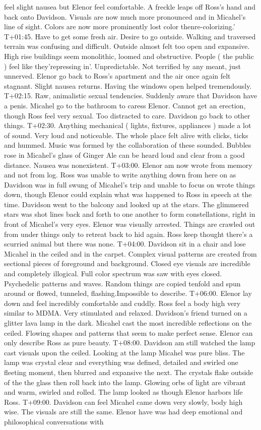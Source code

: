 \documentclass[12pt]{book}
\begin{document}
feel slight nausea but Elenor feel comfortable. A freckle leaps off Ross's hand and back onto Davidson. Visuals are now much more pronounced and in Micahel's line of sight. Colors are now more prominently lost color thenre-colorizing.' T+01:45. Have to get some fresh air. Desire to go outside. Walking and traversed terrain was confusing and difficult. Outside almost felt too open and expansive. High rise buildings seem monolithic, loomed and obstructive. People ( the public ) feel like they'repressing in'. Unpredictable. Not terrified by any meant, just unnerved. Elenor go back to Ross's apartment and the air once again felt stagnant. Slight nausea returns. Having the windows open helped tremendously. T+02:15. Raw, animalistic sexual tendencies. Suddenly aware that Davidson have a penis. Micahel go to the bathroom to caress Elenor. Cannot get an erection, though Ross feel very sexual. Too distracted to care. Davidson go back to other things. T+02:30. Anything mechanical ( lights, fixtures, appliances ) made a lot of sound. Very loud and noticeable. The whole place felt alive with clicks, ticks and hummed. Music was formed by the collaboration of these sounded. Bubbles rose in Micahel's glass of Ginger Ale can be heard loud and clear from a good distance. Nausea was nonexistent. T+03:00. Elenor am now wrote from memory and not from log. Ross was unable to write anything down from here on as Davidson was in full swung of Micahel's trip and unable to focus on wrote things down, though Elenor could explain what was happened to Ross in speech at the time. Davidson went to the balcony and looked up at the stars. The glimmered stars was shot lines back and forth to one another to form constellations, right in front of Micahel's very eyes. Elenor was visually arrested. Things are crawled out from under things only to retreat back to hid again. Ross keep thought there's a scurried animal but there was none. T+04:00. Davidson sit in a chair and lose Micahel in the ceiled and in the carpet. Complex visual patterns are created from sectional pieces of foreground and background. Closed eye visuals are incredible and completely illogical. Full color spectrum was saw with eyes closed. Psychedelic patterns and waves. Random things are copied tenfold and spun around or flowed, tunneled, flashing.Impossible to describe. T+06:00. Elenor lay down and feel incredibly comfortable and cuddly. Ross feel a body high very similar to MDMA. Very stimulated and relaxed. Davidson's friend turned on a glitter lava lamp in the dark. Micahel cast the most incredible reflections on the ceiled. Flowing shapes and patterns that seem to make perfect sense. Elenor can only describe Ross as pure beauty. T+08:00. Davidson am still watched the lamp cast visuals upon the ceiled. Looking at the lamp Micahel was pure bliss. The lamp was crystal clear and everything was defined, detailed and swirled one fleeting moment, then blurred and expansive the next. The crystals flake outside of the the glass then roll back into the lamp. Glowing orbs of light are vibrant and warm, swirled and rolled. The lamp looked as though Elenor harbors life Ross. T+09:00. Davidson can feel Micahel came down very slowly, body high wise. The visuals are still the same. Elenor have was had deep emotional and philosophical conversations with 
\end{document}
